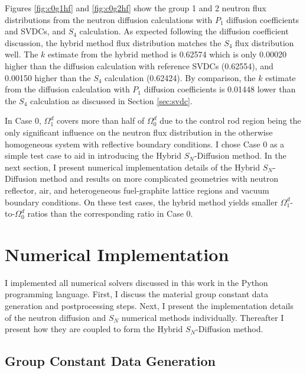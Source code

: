 Figures \ref{fig:c0g1hf} and \ref{fig:c0g2hf} show the group 1 and 2 neutron flux distributions
from the neutron diffusion calculations with $P_1$ diffusion coefficients and \glspl{SVDC}, and
$S_4$ calculation. As expected following the diffusion coefficient discussion, the hybrid method
flux distribution matches the $S_4$ flux distribution well. The $k$ estimate from the hybrid
method is 0.62574 which is only 0.00020 higher than the diffusion calculation with reference
\glspl{SVDC} (0.62554), and 0.00150 higher than the $S_4$ calculation (0.62424). By comparison, the
$k$ estimate from the diffusion calculation with $P_1$ diffusion coefficients is 0.01448 lower than
the $S_4$ calculation as discussed in Section \ref{sec:svdc}.

In Case 0, $\Omega^d_1$ covers more than half of $\Omega^d_0$ due to
the control rod region being the only significant influence on the neutron flux distribution in the
otherwise homogeneous system with reflective boundary conditions. I chose Case 0 as a simple test
case to aid in introducing the Hybrid $S_N$-Diffusion method. In the next section, I
present numerical implementation details of the Hybrid $S_N$-Diffusion method and results on more
complicated geometries with neutron reflector, air, and heterogeneous fuel-graphite lattice
regions and vacuum boundary conditions. On these test cases, the hybrid method yields
smaller $\Omega^d_1$-to-$\Omega^d_0$ ratios than the corresponding ratio in Case 0.

\section{Numerical Implementation} \label{sec:implementation}

I implemented all numerical solvers discussed in this work in the Python programming language.
First, I discuss the material group constant data generation and postprocessing steps. Next, I
present the implementation details of the neutron diffusion and $S_N$ numerical methods
individually. Thereafter I present how they are coupled to form the Hybrid $S_N$-Diffusion method.

\subsection{Group Constant Data Generation}

